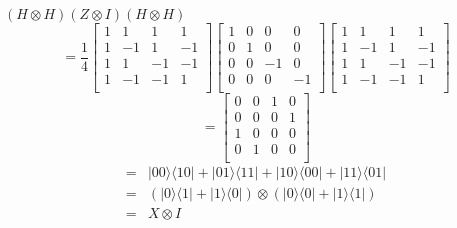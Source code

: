 \documentclass{assignment}
\newcommand{\ket}[1]{\ensuremath{|{#1}\rangle}}
\newcommand{\bra}[1]{\ensuremath{\langle{#1}|}}
\begin{document}
\begin{problemlist}
  \clearpage
  \pbitem
  \begin{problem}
  \end{problem}
  \begin{answer}
    \\
    $(H \otimes H)(Z \otimes I)(H \otimes H)$\\
    \[
    =\frac{1}{4}
    \begin{bmatrix}
      1 & 1 & 1 & 1\\
      1 & -1 & 1 & -1\\
      1 & 1 & -1 & -1\\
      1 & -1 & -1 & 1\\
    \end{bmatrix}
    \begin{bmatrix}
      1 & 0 & 0 & 0\\
      0 & 1 & 0 & 0\\
      0 & 0 & -1 & 0\\
      0 & 0 & 0 & -1\\
    \end{bmatrix}
    \begin{bmatrix}
      1 & 1 & 1 & 1\\
      1 & -1 & 1 & -1\\
      1 & 1 & -1 & -1\\
      1 & -1 & -1 & 1\\
    \end{bmatrix}
    \]
    \[
    =
    \begin{bmatrix}
      0 & 0 & 1 & 0\\
      0 & 0 & 0 & 1\\
      1 & 0 & 0 & 0\\
      0 & 1 & 0 & 0\\
    \end{bmatrix}
    \]
    \begin{align*}
      =&\ket{00}\bra{10}+\ket{01}\bra{11}+\ket{10}\bra{00}+\ket{11}\bra{01}\\
      =&(\ket{0}\bra{1}+\ket{1}\bra{0})\otimes(\ket{0}\bra{0}+\ket{1}\bra{1})\\
      =&X\otimes I\\
    \end{align*}
  \end{answer}


\end{problemlist}
\end{document}
